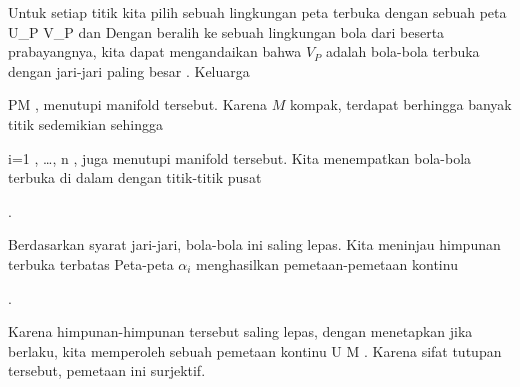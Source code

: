 Untuk setiap titik
 kita pilih sebuah lingkungan peta terbuka
 dengan sebuah peta
 {U_P } {V_P
} {}
dan
 Dengan beralih ke sebuah lingkungan bola dari
 beserta prabayangnya, kita dapat mengandaikan bahwa $V_P$ adalah bola-bola terbuka dengan jari-jari paling besar
. Keluarga

 {}
 {P\in M} {}
 {} {} {} {,}
menutupi manifold tersebut. Karena $M$ kompak, terdapat berhingga banyak titik
 sedemikian sehingga

 {}
 {i=1 , \ldots , n} {}
 {} {} {} {,}
juga menutupi manifold tersebut. Kita menempatkan bola-bola terbuka
 di dalam
 {} {}
dengan titik-titik pusat

 { . }

Berdasarkan syarat jari-jari, bola-bola ini saling lepas. Kita meninjau himpunan terbuka terbatas
 Peta-peta $\alpha_i$ menghasilkan pemetaan-pemetaan kontinu

 { . }

Karena himpunan-himpunan tersebut saling lepas, dengan menetapkan
 jika
 berlaku, kita memperoleh sebuah pemetaan kontinu
\maabbdisp {\varphi} { U } {M
} {.}
Karena sifat tutupan tersebut, pemetaan ini surjektif.

